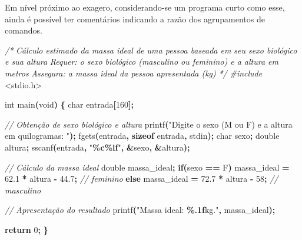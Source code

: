 \documentclass[
  11pt,
  a4paper,
]{scrbook}
\newenvironment{Shaded}{\begin{snugshade}}{\end{snugshade}}
\newcommand{\CharTok}[1]{\textcolor[rgb]{0.31,0.60,0.02}{#1}}
\newcommand{\CommentTok}[1]{\textcolor[rgb]{0.56,0.35,0.01}{\textit{#1}}}
\newcommand{\ControlFlowTok}[1]{\textcolor[rgb]{0.13,0.29,0.53}{\textbf{#1}}}
\newcommand{\DataTypeTok}[1]{\textcolor[rgb]{0.13,0.29,0.53}{#1}}
\newcommand{\DecValTok}[1]{\textcolor[rgb]{0.00,0.00,0.81}{#1}}
\newcommand{\FloatTok}[1]{\textcolor[rgb]{0.00,0.00,0.81}{#1}}
\newcommand{\ImportTok}[1]{#1}
\newcommand{\KeywordTok}[1]{\textcolor[rgb]{0.13,0.29,0.53}{\textbf{#1}}}
\newcommand{\NormalTok}[1]{#1}
\newcommand{\OperatorTok}[1]{\textcolor[rgb]{0.81,0.36,0.00}{\textbf{#1}}}
\newcommand{\PreprocessorTok}[1]{\textcolor[rgb]{0.56,0.35,0.01}{\textit{#1}}}
\newcommand{\SpecialCharTok}[1]{\textcolor[rgb]{0.81,0.36,0.00}{\textbf{#1}}}
\newcommand{\StringTok}[1]{\textcolor[rgb]{0.31,0.60,0.02}{#1}}
\begin{document}
Em nível próximo ao exagero, considerando-se um programa curto como
esse, ainda é possível ter comentários indicando a razão dos
agrupamentos de comandos.

\begin{Shaded}
\begin{Highlighting}[]
\CommentTok{/*}
\CommentTok{Cálculo estimado da massa ideal de uma pessoa baseada em seu sexo biológico}
\CommentTok{e sua altura}
\CommentTok{Requer: o sexo biológico (masculino ou feminino) e a altura em metros}
\CommentTok{Assegura: a massa ideal da pessoa apresentada (kg)}
\CommentTok{*/}
\PreprocessorTok{\#include }\ImportTok{\textless{}stdio.h\textgreater{}}

\DataTypeTok{int}\NormalTok{ main}\OperatorTok{(}\DataTypeTok{void}\OperatorTok{)} \OperatorTok{\{}
    \DataTypeTok{char}\NormalTok{ entrada}\OperatorTok{[}\DecValTok{160}\OperatorTok{];}

    \CommentTok{// Obtenção de sexo biológico e altura}
\NormalTok{    printf}\OperatorTok{(}\StringTok{"Digite o sexo (M ou F) e a altura em quilogramas: "}\OperatorTok{);}
\NormalTok{    fgets}\OperatorTok{(}\NormalTok{entrada}\OperatorTok{,} \KeywordTok{sizeof}\NormalTok{ entrada}\OperatorTok{,}\NormalTok{ stdin}\OperatorTok{);}
    \DataTypeTok{char}\NormalTok{ sexo}\OperatorTok{;}
    \DataTypeTok{double}\NormalTok{ altura}\OperatorTok{;}
\NormalTok{    sscanf}\OperatorTok{(}\NormalTok{entrada}\OperatorTok{,} \StringTok{"}\SpecialCharTok{\%c\%lf}\StringTok{"}\OperatorTok{,} \OperatorTok{\&}\NormalTok{sexo}\OperatorTok{,} \OperatorTok{\&}\NormalTok{altura}\OperatorTok{);}

    \CommentTok{// Cálculo da massa ideal}
    \DataTypeTok{double}\NormalTok{ massa\_ideal}\OperatorTok{;}
    \ControlFlowTok{if}\OperatorTok{(}\NormalTok{sexo }\OperatorTok{==} \CharTok{\textquotesingle{}F\textquotesingle{}}\OperatorTok{)}
\NormalTok{        massa\_ideal }\OperatorTok{=} \FloatTok{62.1} \OperatorTok{*}\NormalTok{ altura }\OperatorTok{{-}} \FloatTok{44.7}\OperatorTok{;}  \CommentTok{// feminino}
    \ControlFlowTok{else}
\NormalTok{        massa\_ideal }\OperatorTok{=} \FloatTok{72.7} \OperatorTok{*}\NormalTok{ altura }\OperatorTok{{-}} \DecValTok{58}\OperatorTok{;}  \CommentTok{// masculino}

    \CommentTok{// Apresentação do resultado}
\NormalTok{    printf}\OperatorTok{(}\StringTok{"Massa ideal: }\SpecialCharTok{\%.1f}\StringTok{kg."}\OperatorTok{,}\NormalTok{ massa\_ideal}\OperatorTok{);}

    \ControlFlowTok{return} \DecValTok{0}\OperatorTok{;}
\OperatorTok{\}}
\end{Highlighting}
\end{Shaded}
\end{document}
